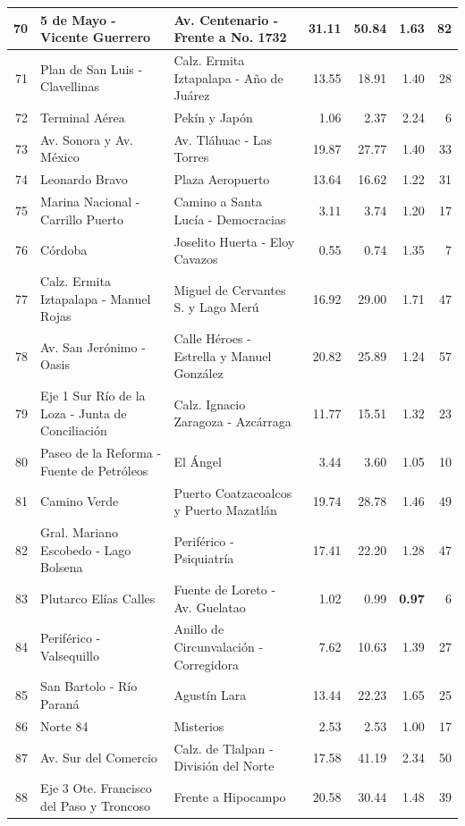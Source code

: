 {\begin{longtable}{|r|p{5.0cm}|p{5.0cm}|r|r|r|r|}
  \hline
  70 & 5 de Mayo - Vicente Guerrero & Av. Centenario - Frente a No. 1732 & 31.11 & 50.84 & 1.63 & 82 \\
  \hline
  71 & Plan de San Luis - Clavellinas & Calz. Ermita Iztapalapa - Año de Juárez & 13.55 & 18.91 & 1.40 & 28 \\
  \hline
  72 & Terminal Aérea & Pekín y Japón & 1.06 & 2.37 & 2.24 & 6 \\
  \hline
  73 & Av. Sonora y Av. México & Av. Tláhuac - Las Torres & 19.87 & 27.77 & 1.40 & 33 \\
  \hline
  74 & Leonardo Bravo & Plaza Aeropuerto & 13.64 & 16.62 & 1.22 & 31 \\
  \hline
  75 & Marina Nacional - Carrillo Puerto & Camino a Santa Lucía - Democracias & 3.11 & 3.74 & 1.20 & 17 \\
  \hline
  76 & Córdoba & Joselito Huerta - Eloy Cavazos & 0.55 & 0.74 & 1.35 & 7 \\
  \hline
  77 & Calz. Ermita Iztapalapa - Manuel Rojas & Miguel de Cervantes S. y Lago Merú & 16.92 & 29.00 & 1.71 & 47 \\
  \hline
  78 & Av. San Jerónimo - Oasis & Calle Héroes - Estrella y Manuel González & 20.82 & 25.89 & 1.24 & 57 \\
  \hline
  79 & Eje 1 Sur Río de la Loza - Junta de Conciliación & Calz. Ignacio Zaragoza - Azcárraga & 11.77 & 15.51 & 1.32 & 23 \\
  \hline
  80 & Paseo de la Reforma - Fuente de Petróleos & El Ángel & 3.44 & 3.60 & 1.05 & 10 \\
  \hline
  81 & Camino Verde & Puerto Coatzacoalcos y Puerto Mazatlán & 19.74 & 28.78 & 1.46 & 49 \\
  \hline
  82 & Gral. Mariano Escobedo - Lago Bolsena & Periférico - Psiquiatría & 17.41 & 22.20 & 1.28 & 47 \\
  \hline
  83 & Plutarco Elías Calles & Fuente de Loreto - Av. Guelatao & 1.02 & 0.99 & \textbf{0.97} & 6 \\
  \hline
  84 & Periférico - Valsequillo & Anillo de Circunvalación - Corregidora & 7.62 & 10.63 & 1.39 & 27 \\
  \hline
  85 & San Bartolo - Río Paraná & Agustín Lara & 13.44 & 22.23 & 1.65 & 25 \\
  \hline
  86 & Norte 84 & Misterios & 2.53 & 2.53 & 1.00 & 17 \\
  \hline
  87 & Av. Sur del Comercio & Calz. de Tlalpan - División del Norte & 17.58 & 41.19 & 2.34 & 50 \\
  \hline
  88 & Eje 3 Ote. Francisco del Paso y Troncoso & Frente a Hipocampo & 20.58 & 30.44 & 1.48 & 39 \\

\end{longtable}}
